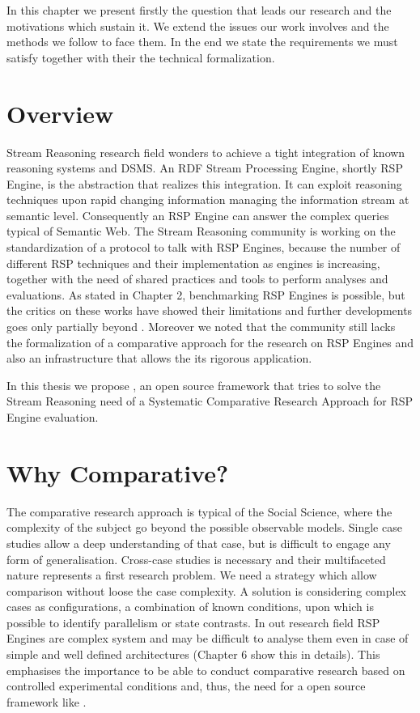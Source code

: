 In this chapter we present firstly the question that leads our research and the motivations which sustain it. We extend the issues our work involves and the methods we follow to face them. In the end we state the requirements we must satisfy together with their the technical formalization. 

\section{Overview}
Stream Reasoning research field wonders to achieve a tight integration of known reasoning systems and DSMS. An RDF Stream Processing Engine, shortly RSP Engine, is the abstraction that realizes this integration. It can exploit reasoning techniques upon rapid changing information \cite{Background SW, DSMS, SR} managing the information stream at semantic level. Consequently an RSP Engine can answer the complex queries typical of Semantic Web. The Stream Reasoning community is working on the standardization of a protocol to talk with RSP Engines, because the number of different RSP techniques and their implementation as engines is increasing, together with the need of shared practices and tools to perform analyses and evaluations. As stated in Chapter 2, benchmarking RSP Engines is possible,
but the critics on these works have showed their limitations and further developments goes only partially beyond \cite{paper paper}. Moreover we noted that the community still lacks the formalization of a comparative approach for the research on RSP Engines and also an infrastructure that allows the its rigorous application.

In this thesis we propose \namens, an open source framework that tries to solve the Stream Reasoning need of a Systematic Comparative Research Approach for RSP Engine evaluation.

\section{Why Comparative?}

The comparative research approach is typical of the Social Science, where the complexity of the subject go beyond the possible observable models. Single case studies allow a deep understanding of that case, but is difficult to engage any form of generalisation. Cross-case studies is necessary and their multifaceted nature represents a first research problem. We need a strategy which allow comparison without loose the case complexity. A solution is considering complex cases as configurations, a combination of known conditions, upon which is possible to identify parallelism or state contrasts. In out research field RSP Engines are complex system and may be difficult to analyse them even in case of simple and well defined architectures (Chapter 6 show this in details). This emphasises the importance to be able to conduct comparative research based on controlled experimental conditions and, thus, the need for a open source framework like \name.

